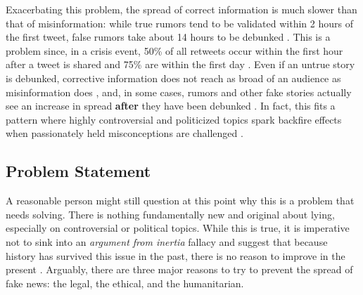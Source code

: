 \documentclass[preprint,review,12pt]{elsarticle}
\begin{document}
Exacerbating this problem, the spread of correct information is much slower than that of misinformation: while true rumors tend to be validated within 2 hours of the first tweet, false rumors take about 14 hours to be debunked \cite{zubiaga2016analysing,shao2016hoaxy}. This is a problem since, in a crisis event, 50\% of all retweets occur within the first hour after a tweet is shared and 75\% are within the first day \cite{kwak2010twitter}. Even if an untrue story is debunked, corrective information does not reach as broad of an audience as misinformation does \cite{maddock2015characterizing, vosoughi2018spread}, and, in some cases, rumors and other fake stories actually see an increase in spread \textbf{after} they have been debunked \cite{starbird2014rumors}. In fact, this fits a pattern where highly controversial and politicized topics spark backfire effects when passionately held misconceptions are challenged \cite{gollust2009polarizing,nyhan2010corrections,nyhan2013hazards,redlawsk2010affective,schaffner2016misinformation,hart2012boomerang}.

\subsection{Problem Statement}
\label{Problem Statement}
A reasonable person might still question at this point why this is a problem that needs solving. There is nothing fundamentally new and original about lying, especially on controversial or political topics. While this is true, it is imperative not to sink into an \textit{argument from inertia} fallacy and suggest that because history has survived this issue in the past, there is no reason to improve in the present \cite{bennett2012logically}. Arguably, there are three major reasons to try to prevent the spread of fake news: the legal, the ethical, and the humanitarian.
\end{document}
